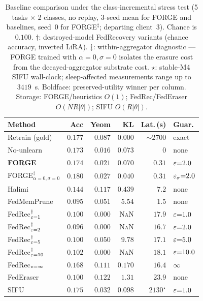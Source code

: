 \begin{table}[t]
\centering
\scriptsize
\setlength{\tabcolsep}{3pt}
\begin{tabular}{lrrrrl}
\toprule
Method & Acc & Yeom & KL & Lat.\,(s) & Guar. \\
\midrule
Retrain (gold)   & $0.177$ & $0.087$ & $0.000$ & ${\sim}2700$ & exact \\
No-unlearn       & $0.173$ & $0.016$ & $0.073$ & $0$          & none  \\
\textbf{FORGE}   & $\mathbf{0.174}$ & $\mathbf{0.021}$ & $\mathbf{0.070}$ & $\mathbf{0.31}$ & $\varepsilon{=}2.0$ \\
FORGE$^{\ddag}_{\alpha{=}0,\sigma{=}0}$ & $0.180$ & $0.027$ & $0.040$ & $0.31$ & $\varepsilon_\sigma{=}2.0$ \\
\midrule
Halimi \cite{halimi2022}                 & $0.144$ & $0.117$ & $0.439$       & $7.2$          & none \\
FedMemPrune \cite{wei2026fedmemprune}    & $0.095$ & $0.051$ & $5.54$        & $1.5$          & none \\
FedRec$^{\dag}_{\varepsilon{=}1}$               & $0.100$ & $0.000$ & \textsc{NaN}  & $17.9$         & $\varepsilon{=}1.0$ \\
FedRec$^{\dag}_{\varepsilon{=}2}$               & $0.096$ & $0.000$ & \textsc{NaN}  & $16.7$         & $\varepsilon{=}2.0$ \\
FedRec$^{\dag}_{\varepsilon{=}5}$               & $0.100$ & $0.050$ & $9.78$        & $17.1$         & $\varepsilon{=}5.0$ \\
FedRec$^{\dag}_{\varepsilon{=}10}$              & $0.102$ & $0.000$ & \textsc{NaN}  & $18.1$         & $\varepsilon{=}10.0$ \\
FedRec$_{\varepsilon{=}\infty}$                 & $0.168$ & $\mathbf{0.111}$ & $0.170$ & $16.4$      & $\infty$ \\
FedEraser \cite{liu2021federaser}        & $0.100$ & $0.122$ & $1.31$        & $23.9$         & none \\
SIFU \cite{fraboni2024sifu}              & $0.175$ & $0.032$ & $0.098$       & $2130^{\star}$ & $\varepsilon{=}1.0$ \\
\bottomrule
\end{tabular}
\caption{Baseline comparison under the class-incremental stress test (5 tasks $\times$
2 classes, no replay, 3-seed mean for FORGE and baselines, seed~$0$ for
FORGE$^{\ddag}$; departing client~3). Chance is $0.100$. $\dag$: destroyed-model
FedRecovery variants (chance accuracy, inverted LiRA). $\ddag$: within-aggregator
diagnostic — FORGE trained with $\alpha{=}0,\sigma{=}0$ isolates the erasure cost
from the decayed-aggregator substrate cost. $\star$: stable-M4 SIFU wall-clock;
sleep-affected measurements range up to $3419$~s. Boldface: preserved-utility
winner per column. Storage: FORGE/heuristics $O(1)$; FedRec/FedEraser
$O(NR|\theta|)$; SIFU $O(R|\theta|)$.}
\label{tab:cifar10-ci-baselines}
\end{table}


